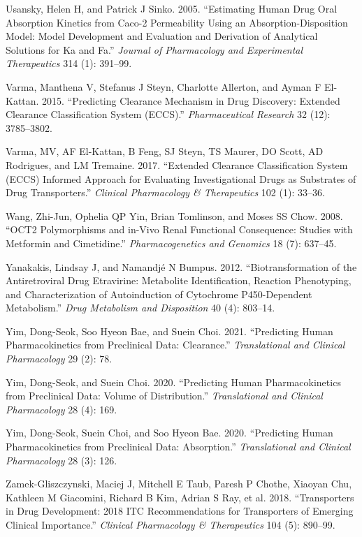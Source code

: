 \documentclass[
  11pt,
  krantz2, a4paper, twoside]{krantz}
\newlength{\cslhangindent}
\newenvironment{CSLReferences}[2] %
 {\begin{list}{}{%
  \setlength{\itemindent}{0pt}
  \setlength{\leftmargin}{0pt}
  \setlength{\parsep}{0pt}
  \ifodd #1
   \setlength{\leftmargin}{\cslhangindent}
   \setlength{\itemindent}{-1\cslhangindent}
  \fi
  \setlength{\itemsep}{#2\baselineskip}}}
 {\end{list}}
\begin{document}
\begin{CSLReferences}{1}{0}
Usansky, Helen H, and Patrick J Sinko. 2005. {``Estimating Human Drug Oral Absorption Kinetics from Caco-2 Permeability Using an Absorption-Disposition Model: Model Development and Evaluation and Derivation of Analytical Solutions for Ka and Fa.''} \emph{Journal of Pharmacology and Experimental Therapeutics} 314 (1): 391--99.

Varma, Manthena V, Stefanus J Steyn, Charlotte Allerton, and Ayman F El-Kattan. 2015. {``Predicting Clearance Mechanism in Drug Discovery: Extended Clearance Classification System (ECCS).''} \emph{Pharmaceutical Research} 32 (12): 3785--3802.

Varma, MV, AF El-Kattan, B Feng, SJ Steyn, TS Maurer, DO Scott, AD Rodrigues, and LM Tremaine. 2017. {``Extended Clearance Classification System (ECCS) Informed Approach for Evaluating Investigational Drugs as Substrates of Drug Transporters.''} \emph{Clinical Pharmacology \& Therapeutics} 102 (1): 33--36.

Wang, Zhi-Jun, Ophelia QP Yin, Brian Tomlinson, and Moses SS Chow. 2008. {``OCT2 Polymorphisms and in-Vivo Renal Functional Consequence: Studies with Metformin and Cimetidine.''} \emph{Pharmacogenetics and Genomics} 18 (7): 637--45.

Yanakakis, Lindsay J, and Namandjé N Bumpus. 2012. {``Biotransformation of the Antiretroviral Drug Etravirine: Metabolite Identification, Reaction Phenotyping, and Characterization of Autoinduction of Cytochrome P450-Dependent Metabolism.''} \emph{Drug Metabolism and Disposition} 40 (4): 803--14.

Yim, Dong-Seok, Soo Hyeon Bae, and Suein Choi. 2021. {``Predicting Human Pharmacokinetics from Preclinical Data: Clearance.''} \emph{Translational and Clinical Pharmacology} 29 (2): 78.

Yim, Dong-Seok, and Suein Choi. 2020. {``Predicting Human Pharmacokinetics from Preclinical Data: Volume of Distribution.''} \emph{Translational and Clinical Pharmacology} 28 (4): 169.

Yim, Dong-Seok, Suein Choi, and Soo Hyeon Bae. 2020. {``Predicting Human Pharmacokinetics from Preclinical Data: Absorption.''} \emph{Translational and Clinical Pharmacology} 28 (3): 126.

Zamek-Gliszczynski, Maciej J, Mitchell E Taub, Paresh P Chothe, Xiaoyan Chu, Kathleen M Giacomini, Richard B Kim, Adrian S Ray, et al. 2018. {``Transporters in Drug Development: 2018 ITC Recommendations for Transporters of Emerging Clinical Importance.''} \emph{Clinical Pharmacology \& Therapeutics} 104 (5): 890--99.

\end{CSLReferences}

\printindex
\end{document}
